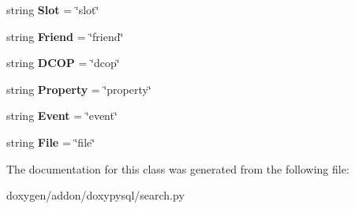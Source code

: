 \begin{DoxyCompactItemize}
string {\bfseries Slot} = \char`\"{}slot\char`\"{}
\item 
\mbox{\label{classsearch_1_1_member_type_aec9abea23bf1bd93c3df27cfb048635c}} 
string {\bfseries Friend} = \char`\"{}friend\char`\"{}
\item 
\mbox{\label{classsearch_1_1_member_type_a02872e8b0d84287c43be90e87187341e}} 
string {\bfseries D\+C\+OP} = \char`\"{}dcop\char`\"{}
\item 
\mbox{\label{classsearch_1_1_member_type_a184e02743c46e8af7da32e01925bab9b}} 
string {\bfseries Property} = \char`\"{}property\char`\"{}
\item 
\mbox{\label{classsearch_1_1_member_type_adf979689f6ec7bad470c351cca3985bd}} 
string {\bfseries Event} = \char`\"{}event\char`\"{}
\item 
\mbox{\label{classsearch_1_1_member_type_a7a26c2f33e192b0614820aadf32ed4ff}} 
string {\bfseries File} = \char`\"{}file\char`\"{}
\end{DoxyCompactItemize}


The documentation for this class was generated from the following file\+:\begin{DoxyCompactItemize}
\item 
doxygen/addon/doxypysql/search.\+py\end{DoxyCompactItemize}
